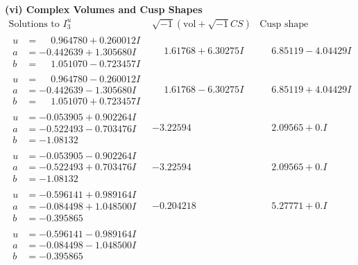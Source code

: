 \documentclass[1p]{elsarticle_modified}
\theoremstyle{definition}
\newcommand{\I}{\sqrt{-1}}
\begin{document}
\newpage\flushleft \textbf{(vi) Complex Volumes and Cusp Shapes}
$$\begin{array}{c|c|c}  
\text{Solutions to }I^u_{3}& \I (\text{vol} + \sqrt{-1}CS) & \text{Cusp shape}\\
 \hline 
\begin{aligned}
u &= \phantom{-}0.964780 + 0.260012 I \\
a &= -0.442639 + 1.305680 I \\
b &= \phantom{-}1.051070 - 0.723457 I\end{aligned}
 & \phantom{-}1.61768 + 6.30275 I & \phantom{-}6.85119 - 4.04429 I \\ \hline\begin{aligned}
u &= \phantom{-}0.964780 - 0.260012 I \\
a &= -0.442639 - 1.305680 I \\
b &= \phantom{-}1.051070 + 0.723457 I\end{aligned}
 & \phantom{-}1.61768 - 6.30275 I & \phantom{-}6.85119 + 4.04429 I \\ \hline\begin{aligned}
u &= -0.053905 + 0.902264 I \\
a &= -0.522493 - 0.703476 I \\
b &= -1.08132\phantom{ +0.000000I}\end{aligned}
 & -3.22594\phantom{ +0.000000I} & \phantom{-}2.09565 + 0. I\phantom{ +0.000000I} \\ \hline\begin{aligned}
u &= -0.053905 - 0.902264 I \\
a &= -0.522493 + 0.703476 I \\
b &= -1.08132\phantom{ +0.000000I}\end{aligned}
 & -3.22594\phantom{ +0.000000I} & \phantom{-}2.09565 + 0. I\phantom{ +0.000000I} \\ \hline\begin{aligned}
u &= -0.596141 + 0.989164 I \\
a &= -0.084498 + 1.048500 I \\
b &= -0.395865\phantom{ +0.000000I}\end{aligned}
 & -0.204218\phantom{ +0.000000I} & \phantom{-}5.27771 + 0. I\phantom{ +0.000000I} \\ \hline\begin{aligned}
u &= -0.596141 - 0.989164 I \\
a &= -0.084498 - 1.048500 I \\
b &= -0.395865\phantom{ +0.000000I}\end{aligned}

\end{array}$$
\end{document}
